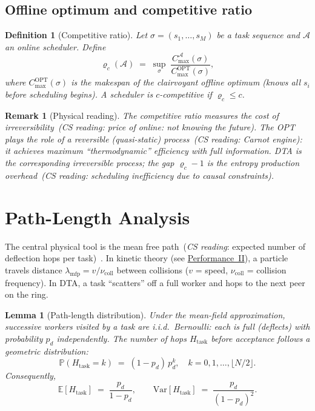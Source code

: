 \documentclass[11pt,a4paper]{report}
\newtheorem{lemma}[theorem]{Lemma}
\newtheorem{definition}{Definition}[section]
\newtheorem{remark}{Remark}[section]
\newcommand{\physics}[2]{#1\ \textnormal{(\emph{CS reading}: #2)}}
\begin{document}
\subsection{Offline optimum and competitive ratio}

\begin{definition}[Competitive ratio]
Let $\sigma = (s_1, \ldots, s_M)$ be a task sequence and
$\mathcal{A}$ an online scheduler.  Define
\[
  \varrho_c(\mathcal{A})
  \;=\;
  \sup_{\sigma}\;
  \frac{C_{\max}^{\mathcal{A}}(\sigma)}{C_{\max}^{\mathrm{OPT}}(\sigma)},
\]
where $C_{\max}^{\mathrm{OPT}}(\sigma)$ is the makespan of the \emph{clairvoyant}
offline optimum (knows all $s_i$ before scheduling begins).
A scheduler is \emph{$c$-competitive} if $\varrho_c \le c$.
\end{definition}

\begin{remark}[Physical reading]
The competitive ratio measures the \physics{cost of irreversibility}{price
of online: not knowing the future}.  The OPT plays the role of a
\physics{reversible (quasi-static) process}{Carnot engine}: it achieves
maximum ``thermodynamic'' efficiency with full information.
DTA is the corresponding irreversible process; the gap $\varrho_c - 1$
is the \physics{entropy production overhead}{scheduling inefficiency due
to causal constraints}.
\end{remark}

\section{Path-Length Analysis}

The central physical tool is the \physics{mean free path}{expected number of
deflection hops per task}~\cite{lifshitz_kinetics,chapman_cowling}.  In kinetic theory (see
\hyperref[chap:kinetic_theory]{Performance~II}), a particle travels distance
$\lambda_{\mathrm{mfp}} = v/\nu_{\mathrm{coll}}$ between collisions
($v$ = speed, $\nu_{\mathrm{coll}}$ = collision frequency).  In DTA,
a task ``scatters'' off a full worker and hops to the next peer on the ring.

\begin{lemma}[Path-length distribution]\label{lem:path_length}
Under the mean-field approximation, successive workers visited by a task
are i.i.d.\ Bernoulli: each is full (deflects) with probability $p_d$
independently.  The number of hops $H_{\mathrm{task}}$ before acceptance
follows a geometric distribution:
\[
  \mathbb{P}(H_{\mathrm{task}} = k) \;=\; (1 - p_d)\, p_d^k,
  \quad k = 0, 1, \ldots, \lfloor N/2 \rfloor.
\]
Consequently,
\[
  \mathbb{E}[H_{\mathrm{task}}] \;=\; \frac{p_d}{1 - p_d},
  \qquad
  \mathrm{Var}[H_{\mathrm{task}}] \;=\; \frac{p_d}{(1-p_d)^2}.
\]
\end{lemma}
\end{document}
